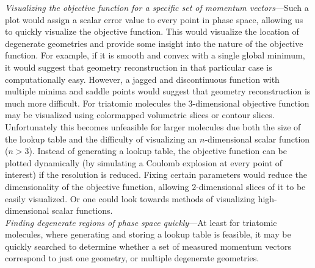 \emph{Visualizing the objective function for a specific set of momentum vectors}---Such a plot would assign a scalar error value to every point in phase space, allowing us to quickly visualize the objective function. This would visualize the location of degenerate geometries and provide some insight into the nature of the objective function. For example, if it is smooth and convex with a single global minimum, it would suggest that geometry reconstruction in that particular case is computationally easy. However, a jagged and discontinuous function with multiple minima and saddle points would suggest that geometry reconstruction is much more difficult. For triatomic molecules the $3$-dimensional objective function may be visualized using colormapped volumetric slices or contour slices. Unfortunately this becomes unfeasible for larger molecules due both the size of the lookup table and the difficulty of visualizing an $n$-dimensional scalar function ($n>3$). Instead of generating a lookup table, the objective function can be plotted dynamically (by simulating a Coulomb explosion at every point of interest) if the resolution is reduced. Fixing certain parameters would reduce the dimensionality of the objective function, allowing $2$-dimensional slices of it to be easily visualized. Or one could look towards methods of visualizing high-dimensional scalar functions. \\

\emph{Finding degenerate regions of phase space quickly}---At least for triatomic molecules, where generating and storing a lookup table is feasible, it may be quickly searched to determine whether a set of measured momentum vectors correspond to just one geometry, or multiple degenerate geometries. 

